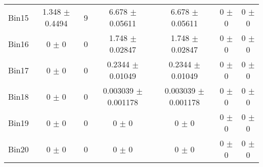 \begin{tabular}{@{\extracolsep{4pt}}lcccccc@{}}
     Bin15 & 1.348 $\pm$ 0.4494 & 9 & 6.678 $\pm$ 0.05611 & 6.678 $\pm$ 0.05611 & 0 $\pm$ 0 & 0 $\pm$ 0 \\ 
     Bin16 & 0 $\pm$ 0 & 0 & 1.748 $\pm$ 0.02847 & 1.748 $\pm$ 0.02847 & 0 $\pm$ 0 & 0 $\pm$ 0 \\ 
     Bin17 & 0 $\pm$ 0 & 0 & 0.2344 $\pm$ 0.01049 & 0.2344 $\pm$ 0.01049 & 0 $\pm$ 0 & 0 $\pm$ 0 \\ 
     Bin18 & 0 $\pm$ 0 & 0 & 0.003039 $\pm$ 0.001178 & 0.003039 $\pm$ 0.001178 & 0 $\pm$ 0 & 0 $\pm$ 0 \\ 
     Bin19 & 0 $\pm$ 0 & 0 & 0 $\pm$ 0 & 0 $\pm$ 0 & 0 $\pm$ 0 & 0 $\pm$ 0 \\ 
     Bin20 & 0 $\pm$ 0 & 0 & 0 $\pm$ 0 & 0 $\pm$ 0 & 0 $\pm$ 0 & 0 $\pm$ 0 \\ 
\hline\hline
  \end{tabular}
